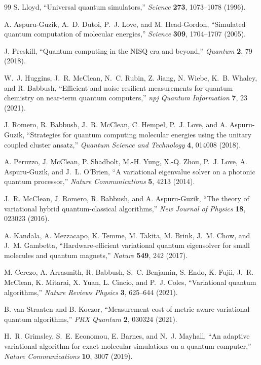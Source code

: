 \documentclass[
  reprint,
  amsmath,
  amssymb,
  aps,
  pra,
  nofootinbib,
  superscriptaddress,
  floatfix
]{revtex4-2}
\begin{document}
\begin{thebibliography}{99}
S. Lloyd,
``Universal quantum simulators,''
\emph{Science} \textbf{273}, 1073--1078 (1996).

A. Aspuru-Guzik, A.~D. Dutoi, P.~J. Love, and M. Head-Gordon,
``Simulated quantum computation of molecular energies,''
\emph{Science} \textbf{309}, 1704--1707 (2005).

J. Preskill,
``Quantum computing in the NISQ era and beyond,''
\emph{Quantum} \textbf{2}, 79 (2018).

W.~J. Huggins, J.~R. McClean, N.~C. Rubin, Z. Jiang, N. Wiebe, K.~B. Whaley, and R. Babbush,
``Efficient and noise resilient measurements for quantum chemistry on near-term quantum computers,''
\emph{npj Quantum Information} \textbf{7}, 23 (2021).

J. Romero, R. Babbush, J.~R. McClean, C. Hempel, P.~J. Love, and A. Aspuru-Guzik,
``Strategies for quantum computing molecular energies using the unitary coupled cluster ansatz,''
\emph{Quantum Science and Technology} \textbf{4}, 014008 (2018).

A. Peruzzo, J. McClean, P. Shadbolt, M.-H. Yung, X.-Q. Zhou, P.~J. Love, A. Aspuru-Guzik, and J.~L. O'Brien,
``A variational eigenvalue solver on a photonic quantum processor,''
\emph{Nature Communications} \textbf{5}, 4213 (2014).

J.~R. McClean, J. Romero, R. Babbush, and A. Aspuru-Guzik,
``The theory of variational hybrid quantum-classical algorithms,''
\emph{New Journal of Physics} \textbf{18}, 023023 (2016).

A. Kandala, A. Mezzacapo, K. Temme, M. Takita, M. Brink, J.~M. Chow, and J.~M. Gambetta,
``Hardware-efficient variational quantum eigensolver for small molecules and quantum magnets,''
\emph{Nature} \textbf{549}, 242 (2017).

M. Cerezo, A. Arrasmith, R. Babbush, S.~C. Benjamin, S. Endo, K. Fujii, J.~R. McClean, K. Mitarai, X. Yuan, L. Cincio, and P.~J. Coles,
``Variational quantum algorithms,''
\emph{Nature Reviews Physics} \textbf{3}, 625--644 (2021).

B. van Straaten and B. Koczor,
``Measurement cost of metric-aware variational quantum algorithms,''
\emph{PRX Quantum} \textbf{2}, 030324 (2021).

H.~R. Grimsley, S.~E. Economou, E. Barnes, and N.~J. Mayhall,
``An adaptive variational algorithm for exact molecular simulations on a quantum computer,''
\emph{Nature Communications} \textbf{10}, 3007 (2019).


\end{thebibliography}
\end{document}
